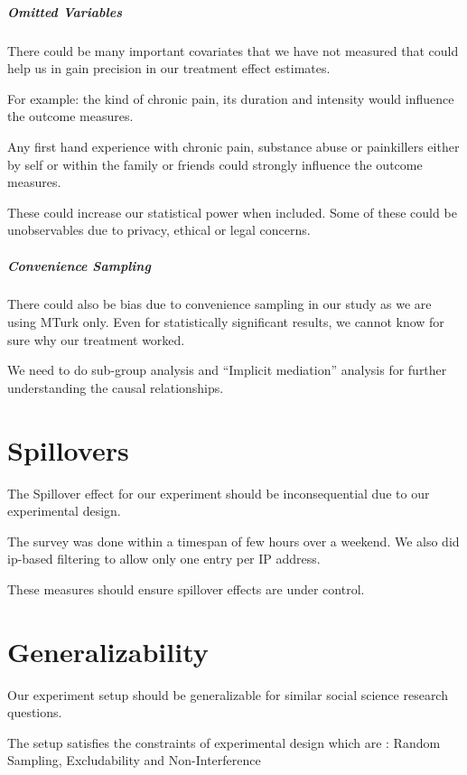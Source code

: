 \documentclass[
]{article}
\begin{document}
\hypertarget{omitted-variables}{%
\subparagraph{Omitted Variables}\label{omitted-variables}}

There could be many important covariates that we have not measured that
could help us in gain precision in our treatment effect estimates.

For example: the kind of chronic pain, its duration and intensity would
influence the outcome measures.

Any first hand experience with chronic pain, substance abuse or
painkillers either by self or within the family or friends could
strongly influence the outcome measures.

These could increase our statistical power when included. Some of these
could be unobservables due to privacy, ethical or legal concerns.

\hypertarget{convenience-sampling}{%
\subparagraph{Convenience Sampling}\label{convenience-sampling}}

There could also be bias due to convenience sampling in our study as we
are using MTurk only. Even for statistically significant results, we
cannot know for sure why our treatment worked.

We need to do sub-group analysis and ``Implicit mediation'' analysis for
further understanding the causal relationships.

\hypertarget{spillovers}{%
\section{Spillovers}\label{spillovers}}

The Spillover effect for our experiment should be inconsequential due to
our experimental design.

The survey was done within a timespan of few hours over a weekend. We
also did ip-based filtering to allow only one entry per IP address.

These measures should ensure spillover effects are under control.

\hypertarget{generalizability}{%
\section{Generalizability}\label{generalizability}}

Our experiment setup should be generalizable for similar social science
research questions.

The setup satisfies the constraints of experimental design which are :
Random Sampling, Excludability and Non-Interference
\end{document}
